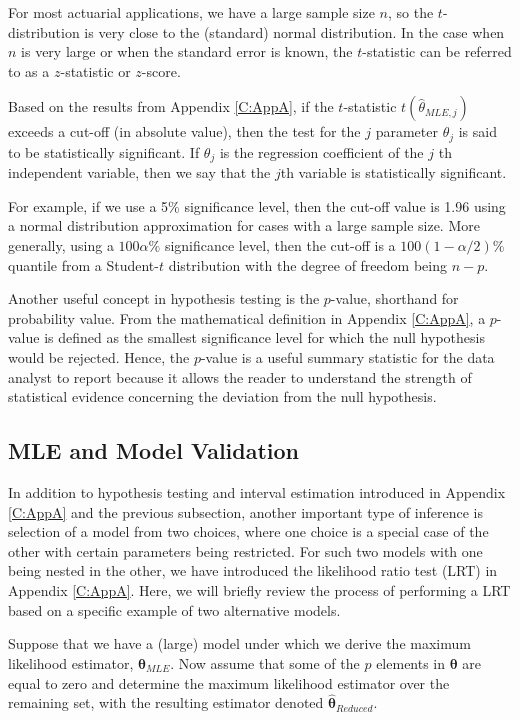 \documentclass[]{book}
\theoremstyle{definition}
\theoremstyle{definition}
\theoremstyle{definition}
\theoremstyle{remark}
\begin{document}
For most actuarial applications, we have a large sample size \(n\), so
the \(t\)-distribution is very close to the (standard) normal
distribution. In the case when \(n\) is very large or when the standard
error is known, the \(t\)-statistic can be referred to as a
\(z\)-statistic or \(z\)-score.

Based on the results from Appendix \ref{C:AppA}, if the \(t\)-statistic
\(t(\hat{\theta}_{MLE,j})\) exceeds a cut-off (in absolute value), then
the test for the \(j\) parameter \(\theta_j\) is said to be
statistically significant. If \(\theta_j\) is the regression coefficient
of the \(j\) th independent variable, then we say that the \(j\)th
variable is statistically significant.

For example, if we use a 5\% significance level, then the cut-off value
is 1.96 using a normal distribution approximation for cases with a large
sample size. More generally, using a \(100 \alpha \%\) significance
level, then the cut-off is a \(100(1-\alpha/2)\%\) quantile from a
Student-\(t\) distribution with the degree of freedom being \(n-p\).

Another useful concept in hypothesis testing is the \(p\)-value,
shorthand for probability value. From the mathematical definition in
Appendix \ref{C:AppA}, a \(p\)-value is defined as the smallest
significance level for which the null hypothesis would be rejected.
Hence, the \(p\)-value is a useful summary statistic for the data
analyst to report because it allows the reader to understand the
strength of statistical evidence concerning the deviation from the null
hypothesis.

\subsection{MLE and Model Validation}\label{S:AppC:MLEModelVal}

In addition to hypothesis testing and interval estimation introduced in
Appendix \ref{C:AppA} and the previous subsection, another important
type of inference is selection of a model from two choices, where one
choice is a special case of the other with certain parameters being
restricted. For such two models with one being nested in the other, we
have introduced the likelihood ratio test (LRT) in Appendix
\ref{C:AppA}. Here, we will briefly review the process of performing a
LRT based on a specific example of two alternative models.

Suppose that we have a (large) model under which we derive the maximum
likelihood estimator, \(\hat{\boldsymbol{\theta}}_{MLE}\). Now assume
that some of the \(p\) elements in \(\boldsymbol \theta\) are equal to
zero and determine the maximum likelihood estimator over the remaining
set, with the resulting estimator denoted
\(\hat{\boldsymbol{\theta}}_{Reduced}\).
\end{document}

